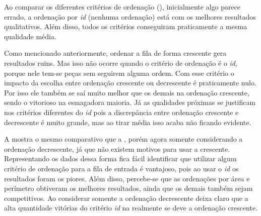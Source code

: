 
Ao comparar os diferentes critérios de ordenação (), inicialmente algo parece
errado, a ordenação por \textit{id} (nenhuma ordenação) está com os melhores resultados
qualitativos.
Além disso, todos os critérios conseguiram praticamente a mesma qualidade média.



Como mencionado anteriormente, ordenar a fila de forma crescente gera resultados ruins.
Mas isso não ocorre quando o critério de ordenação é o \textit{id}, porque nele tem-se peças
sem seguirem alguma ordem.
Com esse critério o impacto da escolha entre ordenação crescente ou decrescente é praticamente
nulo.
Por isso ele também se saí muito melhor que os demais na ordenação crescente, sendo o vitorioso
na esmagadora maioria.
Já as qualidades próximas se justificam nos critérios diferentes do \textit{id} pois a
discrepância entre ordenação crescente e decrescente é muito grande, mas ao tirar média isso acaba
não ficando evidente.

A  mostra o mesmo comparativo que a , porém agora
somente considerando a ordenação decrescente, já que não existem motivos para usar a crescente.
Representando os dados dessa forma fica fácil identificar que utilizar algum critério de ordenação
para a fila de entrada é vantajoso, pois ao usar o \textit{id} os resultados foram os piores.
Além disso, percebe-se que as ordenações por área e perímetro obtiveram os melhores resultados,
ainda que os demais também sejam competitivos.
Ao considerar somente a ordenação decrescente deixa claro que a alta quantidade vitórias do critério
\textit{id} na  realmente se deve a ordenação crescente.


